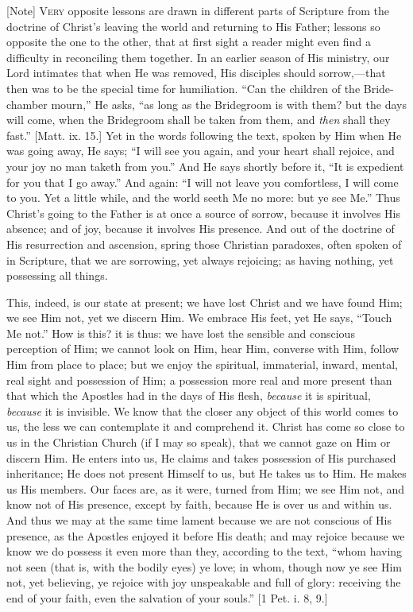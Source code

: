 [Note] V\textsc{ery} opposite lessons are
drawn in different parts of Scripture from the doctrine of Christ's
leaving the world and returning to His Father; lessons so opposite the
one to the other, that at first sight a reader might even find a
difficulty in reconciling them together. In an earlier season of His
ministry, our Lord intimates that when He was removed, His disciples
should sorrow,—that then was to be the special time for humiliation.
``Can the children of the Bride-chamber mourn,'' He asks,
``as long as the Bridegroom is with them? but the days will come,
when the Bridegroom shall be taken from them, and \emph{then} shall they
fast.'' [Matt. ix. 15.] Yet in the words following the text, spoken
by Him when He was going away, He says; ``I will see you again, and
your heart shall rejoice, and your joy no man taketh from you.'' And
He says shortly before it, ``It is expedient for you that I go
away.'' And again: ``I will not leave you comfortless, I will
come to you. Yet a little while, and the world seeth Me no more: but ye
see Me.'' Thus Christ's going to the Father is at once a source of
sorrow, because it involves His absence; and of joy, because it involves
His presence. And out of the doctrine of His resurrection and ascension,
spring those Christian paradoxes, often spoken of in Scripture, that we
are sorrowing, yet always rejoicing; as having nothing, yet possessing
all things.

This, indeed, is our state at present; we have lost Christ and we
have found Him; we see Him not, yet we discern Him. We embrace His feet,
yet He says, ``Touch Me not.'' How is this? it is thus: we have
lost the sensible and conscious perception of Him; we cannot look on
Him, hear Him, converse with Him, follow Him from place to place; but we
enjoy the spiritual, immaterial, inward, mental, real sight and
possession of Him; a possession more real and more present than that
which the Apostles had in the days of His flesh, \emph{because} it is
spiritual, \emph{because} it is invisible. We know that the closer any
object of this world comes to us, the less we can contemplate it and
comprehend it. Christ has come so close to us in the Christian Church
(if I may so speak), that we cannot gaze on Him or discern Him. He
enters into us, He claims and takes possession of His purchased
inheritance; He does not present Himself to us, but He takes us to Him.
He makes us His members. Our faces are, as it were, turned from Him; we
see Him not, and know not of His presence, except by faith, because He
is over us and within us. And thus we may at the same time lament
because we are not conscious of His presence, as the Apostles enjoyed it
before His death; and may rejoice because we know we do possess it even
more than they, according to the text, ``whom having not seen (that
is, with the bodily eyes) ye love; in whom, though now ye see Him not,
yet believing, ye rejoice with joy unspeakable and full of glory:
receiving the end of your faith, even the salvation of your souls.''
[1 Pet. i. 8, 9.]

